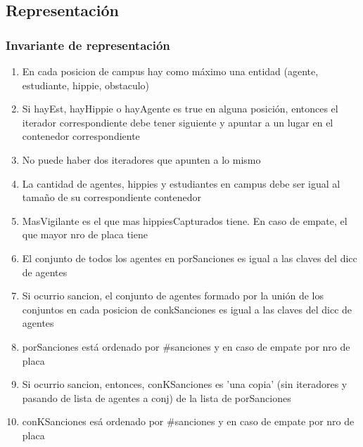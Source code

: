 \subsection{Representación}


\subsubsection*{Invariante de representación}

\begin{enumerate}
  \item En cada posicion de campus hay como m\'aximo una entidad (agente, estudiante, hippie, obstaculo)
  \item Si hayEst, hayHippie o hayAgente es true en alguna posici\'on, entonces el iterador correspondiente debe tener siguiente y apuntar a un lugar en el contenedor correspondiente
  \item No puede haber dos iteradores que apunten a lo mismo
  \item La cantidad de agentes, hippies y estudiantes en campus debe ser igual al tamaño de su correspondiente contenedor
  \item MasVigilante es el que mas hippiesCapturados tiene. En caso de empate, el que mayor nro de placa tiene
  \item El conjunto de todos los agentes en porSanciones es igual a las claves del dicc de agentes
  \item Si ocurrio sancion, el conjunto de agentes formado por la uni\'on de los conjuntos en cada posicion de conkSanciones es igual a las claves del dicc de agentes
  \item porSanciones est\'a ordenado por \#sanciones y en caso de empate por nro de placa
  \item Si ocurrio sancion, entonces, conKSanciones es 'una copia' (sin iteradores y pasando de lista de agentes a conj) de la lista de porSanciones
  \item conKSanciones es\'a ordenado por \#sanciones y en caso de empate por nro de placa


\end{enumerate}

